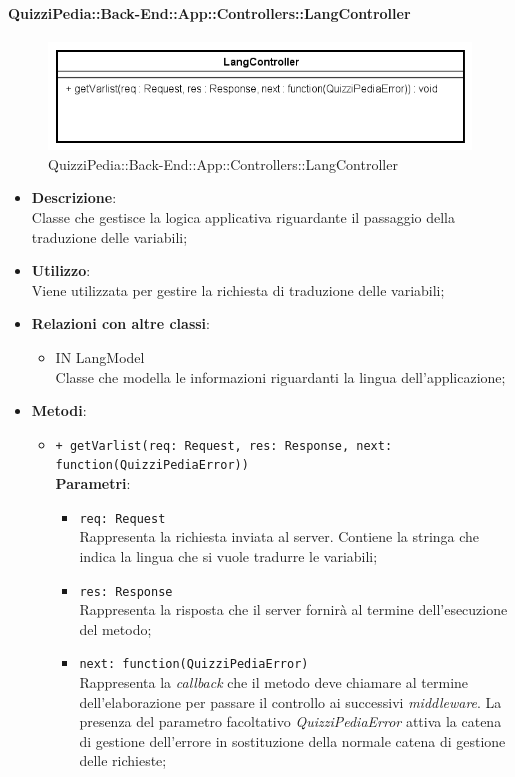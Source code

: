 \paragraph{QuizziPedia::Back-End::App::Controllers::LangController}
\label{QuizziPedia::Back-End::App::Controllers::UserController}
\begin{figure}[ht]
	\centering
	\includegraphics[scale=0.45]{UML/Classi/Back-End/QuizziPedia_Back-End_App_Controllers_langController.png}
	\caption{QuizziPedia::Back-End::App::Controllers::LangController}
\end{figure}
\FloatBarrier
\begin{itemize}
	\item 
	\textbf{Descrizione}:\\
	Classe che gestisce la logica applicativa riguardante il passaggio della traduzione delle variabili;
	\item \textbf{Utilizzo}:\\
	Viene utilizzata per gestire la richiesta di traduzione delle variabili;
	\item \textbf{Relazioni con altre classi}:
	\begin{itemize}
		\item IN LangModel \\
		Classe che modella le informazioni riguardanti la lingua dell'applicazione;
	\end{itemize}
	\item \textbf{Metodi}:
		\begin{itemize}
			\item \texttt{+ getVarlist(req: Request, res: Response, next: function(QuizziPediaError))} \\
			\textbf{Parametri}:
				\begin{itemize}
					\item \texttt{req: Request} \\
					Rappresenta la richiesta inviata al server. Contiene la stringa che indica la lingua che si vuole tradurre le variabili;
					\item \texttt{res: Response} \\
					Rappresenta la risposta che il server fornirà al termine  dell'esecuzione del metodo;
					\item \texttt{next: function(QuizziPediaError)} \\
					Rappresenta la \textit{callback} che il metodo deve chiamare al termine dell'elaborazione per passare il controllo ai successivi \textit{middleware}. La presenza del parametro facoltativo \textit{QuizziPediaError} attiva la catena di gestione dell'errore in sostituzione della normale catena di gestione delle richieste;
				\end{itemize}
		\end{itemize}
\end{itemize}
